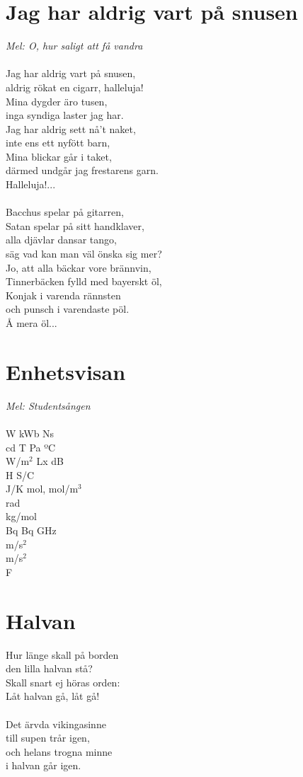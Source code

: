 \documentclass[a5paper,15pt]{article}
\begin{document}
\section{Jag har aldrig vart på snusen}
\emph{Mel: O, hur saligt att få vandra}\\
\\
Jag har aldrig vart på snusen,\\
aldrig rökat en cigarr, halleluja!\\
Mina dygder äro tusen,\\
inga syndiga laster jag har.\\
Jag har aldrig sett nå’t naket,\\
inte ens ett nyfött barn,\\
Mina blickar går i taket,\\
därmed undgår jag frestarens garn.\\
Halleluja!...\\
\\
Bacchus spelar på gitarren,\\
Satan spelar på sitt handklaver,\\
alla djävlar dansar tango,\\
säg vad kan man väl önska sig mer?\\
Jo, att alla bäckar vore brännvin,\\
Tinnerbäcken fylld med bayerskt öl,\\
Konjak i varenda rännsten\\
och punsch i varendaste pöl.\\
Å mera öl...
\\

\section{Enhetsvisan}
\emph{Mel: Studentsången}\\
\\
W kWb Ns\\
cd T Pa ºC\\
W/m$^2$ Lx dB\\
H S/C\\
J/K mol, mol/m$^3$\\
rad\\
kg/mol\\
Bq Bq GHz\\
m/s$^2$\\
m/s$^2$\\
F				   

\section{Halvan}
Hur länge skall på borden\\
den lilla halvan stå?\\
Skall snart ej höras orden:\\
Låt halvan gå, låt gå!\\
\\
Det ärvda vikingasinne\\
till supen trår igen,\\
och helans trogna minne\\
i halvan går igen.
\\
\end{document}
